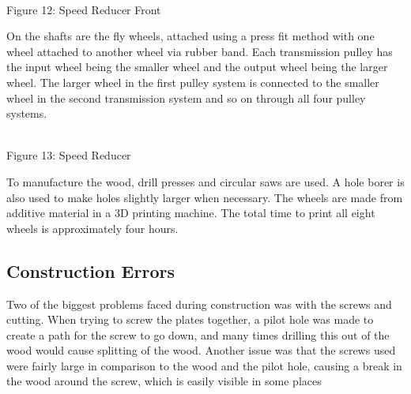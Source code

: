 \documentclass{article}
\begin{document}
\begin{center}
\\
\scriptsize{
Figure 12: Speed Reducer Front
}
\end{center}

On the shafts are the fly wheels, attached using a press fit method with one wheel attached to another wheel via rubber band. Each transmission pulley has the input wheel being the smaller wheel and the output wheel being the larger wheel. The larger wheel in the first pulley system is connected to the smaller wheel in the second transmission system and so on through all four pulley systems. 

\begin{center}
\\
\scriptsize{
Figure 13: Speed Reducer 
}
\end{center}

To manufacture the wood, drill presses and circular saws are used. A hole borer is also used to make holes slightly larger when necessary. The wheels are made from additive material in a 3D printing machine. The total time to print all eight wheels is approximately four hours. 
\subsection{Construction Errors}
Two of the biggest problems faced during construction was with the screws and cutting. When trying to screw the plates together, a pilot hole was made to create a path for the screw to go down, and many times drilling this out of the wood would cause splitting of the wood. Another issue was that the screws used were fairly large in comparison to the wood and the pilot hole, causing a break in the wood around the screw, which is easily visible in some places 
\end{document}
